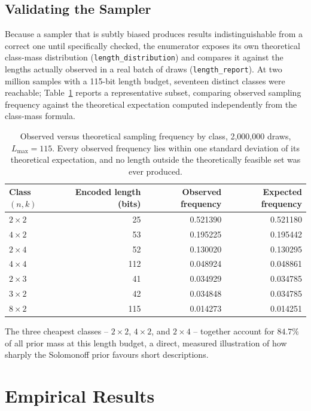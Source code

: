 \documentclass[11pt]{article}
\begin{document}
\subsection{Validating the Sampler}

Because a sampler that is subtly biased produces results indistinguishable from a correct
one until specifically checked, the enumerator exposes its own theoretical class-mass
distribution (\texttt{length\_distribution}) and compares it against the lengths actually
observed in a real batch of draws (\texttt{length\_report}). At two million samples with a
115-bit length budget, seventeen distinct classes were reachable; Table~\ref{tab:sampling}
reports a representative subset, comparing observed sampling frequency against the
theoretical expectation computed independently from the class-mass formula.

\begin{table}[h]
\centering
\begin{tabular}{lrrr}
\toprule
Class $(n,k)$ & Encoded length (bits) & Observed frequency & Expected frequency \\
\midrule
$2\times2$ & 25  & 0.521390 & 0.521180 \\
$4\times2$ & 53  & 0.195225 & 0.195442 \\
$2\times4$ & 52  & 0.130020 & 0.130295 \\
$4\times4$ & 112 & 0.048924 & 0.048861 \\
$2\times3$ & 41  & 0.034929 & 0.034785 \\
$3\times2$ & 42  & 0.034848 & 0.034785 \\
$8\times2$ & 115 & 0.014273 & 0.014251 \\
\bottomrule
\end{tabular}
\caption{Observed versus theoretical sampling frequency by class, 2{,}000{,}000 draws,
$L_{\max}=115$. Every observed frequency lies within one standard deviation of its
theoretical expectation, and no length outside the theoretically feasible set was ever
produced.}
\label{tab:sampling}
\end{table}

The three cheapest classes -- $2\times2$, $4\times2$, and $2\times4$ -- together account
for $84.7\%$ of all prior mass at this length budget, a direct, measured illustration of
how sharply the Solomonoff prior favours short descriptions.

\section{Empirical Results}
\label{sec:results}
\end{document}
